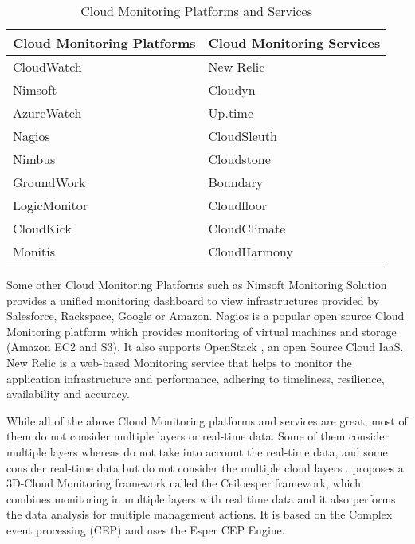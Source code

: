 \documentclass[article,type=msc,colorback,12pt,accentcolor=tud7b]{tudthesis}
\begin{document}
\begin{table}[h!]
  \centering
  \caption{Cloud Monitoring Platforms and Services }
  \label{tab:Table1}
  \begin{tabular}{l|l}
  \hline
  \textbf{Cloud Monitoring Platforms}  & \textbf{Cloud Monitoring Services} \\
    \hline
    CloudWatch \cite{cloudwatchdev} \cite{cloudwatch} & New Relic \cite{newrelic} \\    
    Nimsoft \cite{nimsoft} & Cloudyn \cite{cloudyn} \\        
    AzureWatch \cite{azurewatch} & Up.time \cite{uptime} \\        
    Nagios \cite{nagios} & CloudSleuth \cite{cloudsleuth} \\
    Nimbus \cite{nimbus} & Cloudstone \cite{cloudstone} \\ 
    GroundWork \cite{groundwork} & Boundary \cite{boundary} \\
    LogicMonitor \cite{logicmonitor} & Cloudfloor \cite{cloudfloor} \\ 
    CloudKick \cite{cloudkick} & CloudClimate \cite{cloudclimate} \\    
    Monitis \cite{monitis} & CloudHarmony \cite{cloudharmony} \\
    \hline
    
  \end{tabular}
\end{table}
	
	Some other Cloud Monitoring Platforms such as Nimsoft Monitoring Solution \cite{nimsoft} provides a unified monitoring dashboard to view infrastructures provided by Salesforce, Rackspace, Google or Amazon. Nagios \cite{nagios} is a popular open source Cloud Monitoring platform which provides monitoring of virtual machines and storage (Amazon EC2 and S3). It also supports OpenStack \cite{openstack}, an open Source Cloud IaaS. New Relic \cite{newrelic} is a web-based Monitoring service that helps to monitor the application infrastructure and performance, adhering to timeliness, resilience, availability and accuracy.
	
	While all of the above Cloud Monitoring platforms and services are great, most of them do not consider multiple layers or real-time data. Some of them consider multiple layers whereas do not take into account the real-time data, and some consider real-time data but do not consider the multiple cloud layers \cite{marquezan20143}. \cite{bruneo2015framework} proposes a 3D-Cloud Monitoring framework called the Ceiloesper framework, which combines monitoring in multiple layers with real time data and it also performs the data analysis for multiple management actions. It is based on the Complex event processing (CEP) and uses the Esper CEP Engine.
 		
\end{document}
